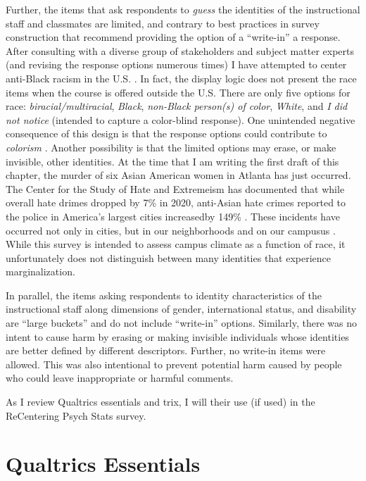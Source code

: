 \documentclass[
  english,
]{book}
\begin{document}
Further, the items that ask respondents to \emph{guess} the identities of the instructional staff and classmates are limited, and contrary to best practices in survey construction that recommend providing the option of a ``write-in'' a response. After consulting with a diverse group of stakeholders and subject matter experts (and revising the response options numerous times) I have attempted to center anti-Black racism in the U.S. \citep{mosley_critical_2021, mosley_radical_2020, singh_building_2020}. In fact, the display logic does not present the race items when the course is offered outside the U.S. There are only five options for race: \emph{biracial/multiracial}, \emph{Black}, \emph{non-Black person(s) of color}, \emph{White}, and \emph{I did not notice} (intended to capture a color-blind response). One unintended negative consequence of this design is that the response options could contribute to \emph{colorism} \citep{adames_fallacy_2021, capielo_rosario_acculturation_2019}. Another possibility is that the limited options may erase, or make invisible, other identities. At the time that I am writing the first draft of this chapter, the murder of six Asian American women in Atlanta has just occurred. The Center for the Study of Hate and Extremeism has documented that while overall hate drimes dropped by 7\% in 2020, anti-Asian hate crimes reported to the police in America's largest cities increasedby 149\% \citep{noauthor_fact_nodate}. These incidents have occurred not only in cities, but in our neighborhoods and on our campusus \citep{kim_guest_2021, kim_yes_2021, noauthor_stop_nodate}. While this survey is intended to assess campus climate as a function of race, it unfortunately does not distinguish between many identities that experience marginalization.

In parallel, the items asking respondents to identity characteristics of the instructional staff along dimensions of gender, international status, and disability are ``large buckets'' and do not include ``write-in'' options. Similarly, there was no intent to cause harm by erasing or making invisible individuals whose identities are better defined by different descriptors. Further, no write-in items were allowed. This was also intentional to prevent potential harm caused by people who could leave inappropriate or harmful comments.

As I review Qualtrics essentials and trix, I will their use (if used) in the ReCentering Psych Stats survey.

\hypertarget{qualtrics-essentials}{%
\section{Qualtrics Essentials}\label{qualtrics-essentials}}
\end{document}
